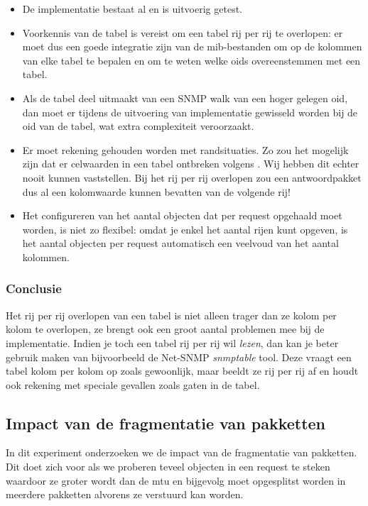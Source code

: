 \begin{itemize}
	\item De implementatie bestaat al en is uitvoerig getest.
	\item Voorkennis van de tabel is vereist om een tabel rij per rij te overlopen: er moet dus een goede integratie zijn van de \gls{mib}-bestanden
		om op de kolommen van elke tabel te bepalen en om te weten welke \glspl{oid} overeenstemmen met een tabel.
	\item Als de tabel deel uitmaakt van een SNMP walk van een hoger gelegen \gls{oid},
		dan moet er tijdens de uitvoering van implementatie gewisseld worden bij de \gls{oid} van de tabel, wat extra complexiteit veroorzaakt.
	\item Er moet rekening gehouden worden met randsituaties.
		Zo zou het mogelijk zijn dat er celwaarden in een tabel ontbreken volgens \cite{net-snmp-table-holes}.
		Wij hebben dit echter nooit kunnen vaststellen.
		Bij het rij per rij overlopen zou een antwoordpakket dus al een kolomwaarde kunnen bevatten van de volgende rij!
	\item Het configureren van het aantal objecten dat per request opgehaald moet worden, is niet zo flexibel:
		omdat je enkel het aantal rijen kunt opgeven,
		is het aantal objecten per request automatisch een veelvoud van het aantal kolommen.
\end{itemize}

\subsubsection{Conclusie}

Het rij per rij overlopen van een tabel is niet alleen trager dan ze kolom per kolom te overlopen,
ze brengt ook een groot aantal problemen mee bij de implementatie.
Indien je toch een tabel rij per rij wil \textit{lezen}, dan kan je beter gebruik maken van bijvoorbeeld de Net-SNMP \textit{snmptable} tool.
Deze vraagt een tabel kolom per kolom op zoals gewoonlijk, maar beeldt ze rij per rij af en houdt ook rekening met speciale gevallen zoals gaten in de tabel.


\subsection{Impact van de fragmentatie van pakketten}

In dit experiment onderzoeken we de impact van de fragmentatie van pakketten.
Dit doet zich voor als we proberen teveel objecten in een request te steken waardoor ze groter wordt dan de \gls{mtu} en
bijgevolg moet opgesplitst worden in meerdere pakketten alvorens ze verstuurd kan worden.

